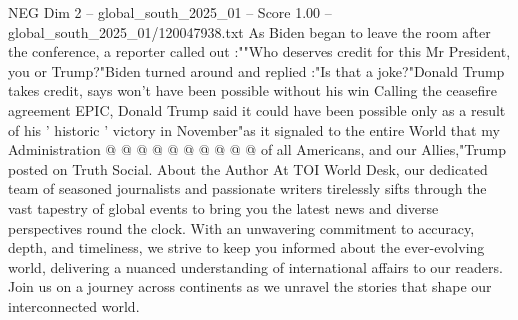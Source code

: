 \begin{textsample}{NEG Dim 2 – global\_south\_2025\_01 – Score 1.00 – global\_south\_2025\_01/120047938.txt}
As Biden began to leave the room after the conference, a reporter called out :""Who deserves credit for this Mr President, you or Trump?"Biden turned around and replied :"Is that a joke?"Donald Trump takes credit, says won't have been possible without his win Calling the ceasefire agreement EPIC, Donald Trump said it could have been possible only as a result of his ' historic ' victory in November"as it signaled to the entire World that my Administration @ @ @ @ @ @ @ @ @ @ of all Americans, and our Allies,"Trump posted on Truth Social.
About the Author At TOI World Desk, our dedicated team of seasoned journalists and passionate writers tirelessly sifts through the vast tapestry of global events to bring you the latest news and diverse perspectives round the clock.
With an unwavering commitment to accuracy, depth, and timeliness, we strive to keep you informed about the ever-evolving world, delivering a nuanced understanding of international affairs to our readers.
Join us on a journey across continents as we unravel the stories that shape our interconnected world.

\end{textsample}
